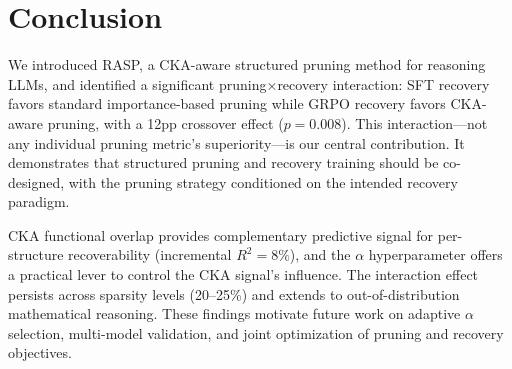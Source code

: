 \documentclass[11pt]{article}
\begin{document}
\section{Conclusion}
\label{sec:conclusion}

We introduced RASP, a CKA-aware structured pruning method for reasoning LLMs, and identified a significant pruning$\times$recovery interaction: SFT recovery favors standard importance-based pruning while GRPO recovery favors CKA-aware pruning, with a 12pp crossover effect ($p{=}0.008$). This interaction---not any individual pruning metric's superiority---is our central contribution. It demonstrates that structured pruning and recovery training should be co-designed, with the pruning strategy conditioned on the intended recovery paradigm.

CKA functional overlap provides complementary predictive signal for per-structure recoverability (incremental $R^2{=}8\%$), and the $\alpha$ hyperparameter offers a practical lever to control the CKA signal's influence. The interaction effect persists across sparsity levels (20--25\%) and extends to out-of-distribution mathematical reasoning. These findings motivate future work on adaptive $\alpha$ selection, multi-model validation, and joint optimization of pruning and recovery objectives.
\end{document}
